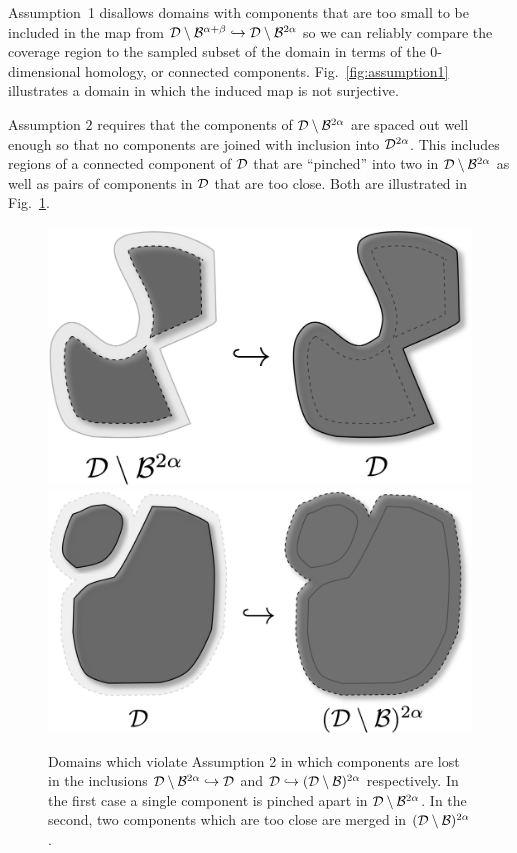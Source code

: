 Assumption~1 disallows domains with components that are too small to be included in the map from ${\mathcal{D}}\setminus{\mathcal{B}}^{\alpha+\beta}\hookrightarrow{\mathcal{D}}\setminus{\mathcal{B}}^{2\alpha}$ so we can reliably compare the coverage region to the sampled subset of the domain in terms of the $0$-dimensional homology, or connected components.
Fig.~\ref{fig:assumption1} illustrates a domain in which the induced map is not surjective.

Assumption $2$ requires that the components of ${\mathcal{D}}\setminus{\mathcal{B}}^{2\alpha}$ are spaced out well enough so that no components are joined with inclusion into ${\mathcal{D}}^{2\alpha}$.
This includes regions of a connected component of ${\mathcal{D}}$ that are ``pinched'' into two in ${\mathcal{D}}\setminus{\mathcal{B}}^{2\alpha}$ as well as pairs of components in ${\mathcal{D}}$ that are too close.
Both are illustrated in Fig.~\ref{fig:assumption2}.

\begin{figure}[htbp]
    \centering
    \includegraphics[scale=0.14]{figures/a2_2_composite.eps}\hspace{5ex}
    \includegraphics[scale=0.14]{figures/a2_1_composite.eps}
    \caption{Domains which violate Assumption 2 in which components are lost in the inclusions ${\mathcal{D}}\setminus{\mathcal{B}}^{2\alpha}\hookrightarrow {\mathcal{D}}$ and ${\mathcal{D}}\hookrightarrow ({\mathcal{D}}\setminus {\mathcal{B}})^{2\alpha}$ respectively. In the first case a single component is pinched apart in ${\mathcal{D}}\setminus{\mathcal{B}}^{2\alpha}$. In the second, two components which are too close are merged in $({\mathcal{D}}\setminus {\mathcal{B}})^{2\alpha}$.}
    \label{fig:assumption2}
\end{figure}

